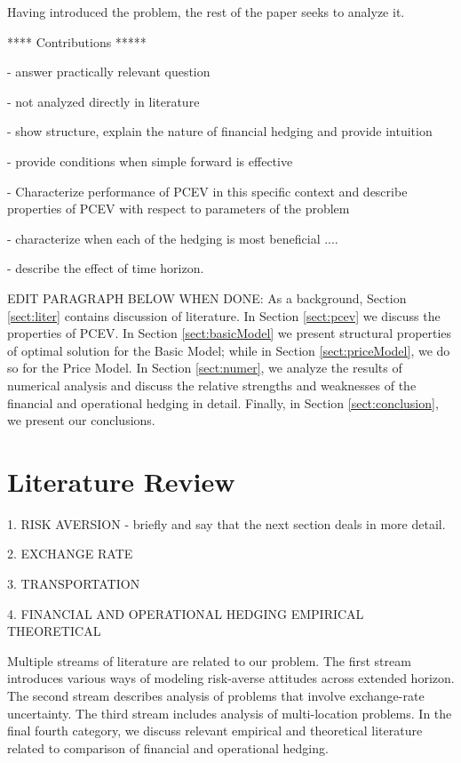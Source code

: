 \documentclass[mnsc,nonblindrev,copyedit]{informs2_wz} %
\begin{document}
Having introduced the problem, the rest of the paper seeks to analyze it.  


**** Contributions *****

- answer practically relevant question

- not analyzed directly in literature

- show structure, explain the nature of financial hedging and provide intuition

- provide conditions when simple forward is effective

- Characterize performance of PCEV in this specific context and describe properties of PCEV with respect to parameters of the problem

- characterize when each of the hedging is most beneficial ....

- describe the effect of time horizon.

EDIT PARAGRAPH BELOW WHEN DONE:
As a background, Section \ref{sect:liter} contains discussion of literature. In Section \ref{sect:pcev} we discuss the properties of PCEV. In Section \ref{sect:basicModel} we present structural properties of optimal solution for the Basic Model; while in Section \ref{sect:priceModel}, we do so for the Price Model.  In Section \ref{sect:numer}, we analyze the results of numerical analysis and discuss the relative strengths and weaknesses of the financial and operational hedging in detail.  Finally, in Section \ref{sect:conclusion}, we present our conclusions.





\section{Literature Review \label{sect:liter}}

1. RISK AVERSION - briefly and say that the next section deals in more detail.

2. EXCHANGE RATE

3. TRANSPORTATION

4. FINANCIAL AND OPERATIONAL HEDGING
	EMPIRICAL
	THEORETICAL


Multiple streams of literature are related to our problem.  The first stream introduces various ways of modeling risk-averse attitudes across extended horizon.  The second stream describes analysis of problems that involve exchange-rate uncertainty.  The third stream includes analysis of multi-location problems.  In the final fourth category, we discuss relevant empirical and theoretical literature related to comparison of financial and operational hedging.
\end{document}
